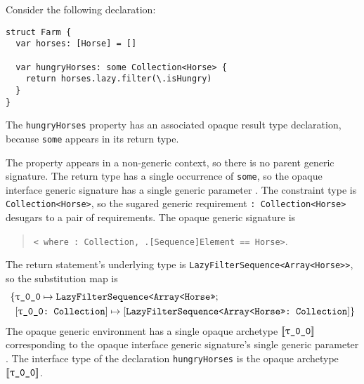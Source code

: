 \documentclass[../generics]{subfiles}
\begin{document}
\begin{example}
Consider the following declaration:
\begin{Verbatim}
struct Farm {
  var horses: [Horse] = []

  var hungryHorses: some Collection<Horse> {
    return horses.lazy.filter(\.isHungry)
  }
}
\end{Verbatim}
The \texttt{hungryHorses} property has an associated opaque result type declaration, because \texttt{some} appears in its return type.

The property appears in a non-generic context, so there is no parent generic signature. The return type has a single occurrence of \texttt{some}, so the opaque interface generic signature has a single generic parameter \texttt{}. The constraint type is \texttt{Collection<Horse>}, so the sugared generic requirement \texttt{:\ Collection<Horse>} desugars to a pair of requirements. The opaque generic signature is
\begin{quote}
\texttt{< where :\ Collection, .[Sequence]Element == Horse>}.
\end{quote}

The return statement's underlying type is \texttt{LazyFilterSequence<Array<Horse>>}, so the substitution map is
\begin{align*}
\SubstMapC{
&\SubstType{\ttgp{0}{0}}{LazyFilterSequence<Array<Horse>>}
}{\\
&\SubstConf{\ttgp{0}{0}}{LazyFilterSequence<Array<Horse>>}{Collection}
}
\end{align*}
The opaque generic environment has a single opaque archetype $\archetype{\ttgp{0}{0}}$ corresponding to the opaque interface generic signature's single generic parameter . The interface type of the declaration \texttt{hungryHorses} is the opaque archetype $\archetype{\ttgp{0}{0}}$.
\end{example}
\end{document}
